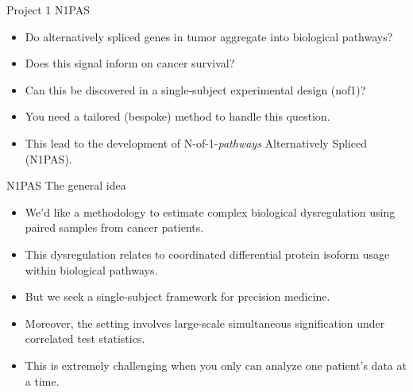 \documentclass[ignorenonframetext,aspectratio=169,]{beamer}
\providecommand{\tightlist}{%
  \setlength{\itemsep}{0pt}\setlength{\parskip}{0pt}}
\begin{document}
\begin{frame}{%
\protect\hypertarget{project-1-n1pas}{%
Project 1 N1PAS}}

\begin{itemize}
\tightlist
\item
  Do alternatively spliced genes in tumor aggregate into biological
  pathways?
\item
  Does this signal inform on cancer survival?
\item
  Can this be discovered in a single-subject experimental design (nof1)?
\item
  You need a tailored (bespoke) method to handle this question.
\item
  This lead to the development of N-of-1-\emph{pathways} Alternatively
  Spliced (N1PAS).
\end{itemize}

\end{frame}

\begin{frame}{%
\protect\hypertarget{n1pas-the-general-idea}{%
N1PAS The general idea}}

\begin{itemize}
\item We'd like a methodology to estimate complex biological dysregulation using paired samples from cancer patients.
\item This dysregulation relates to coordinated differential protein isoform usage within biological pathways.
\item But we seek a single-subject framework for precision medicine.
\item Moreover, the setting involves large-scale simultaneous signification under correlated test statistics.
  \item This is extremely challenging when you only can analyze one patient's data at a time.
\end{itemize}

\end{frame}
\end{document}
